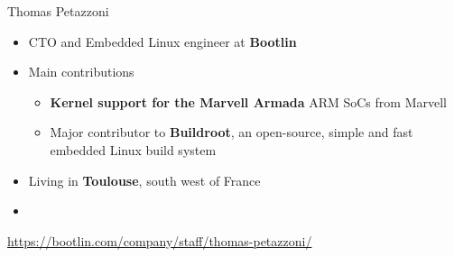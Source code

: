 \begin{frame}{Thomas Petazzoni}
  \begin{itemize}
  \item CTO and Embedded Linux engineer at {\bf Bootlin}
  \item Main contributions
    \begin{itemize}
    \item {\bf Kernel support for the Marvell Armada} ARM SoCs from
      Marvell
    \item Major contributor to {\bf Buildroot}, an open-source, simple and
      fast embedded Linux build system
    \end{itemize}
  \item Living in {\bf Toulouse}, south west of France
  \item {}
  \end{itemize}
  {\small \url{https://bootlin.com/company/staff/thomas-petazzoni/}}
\end{frame}

